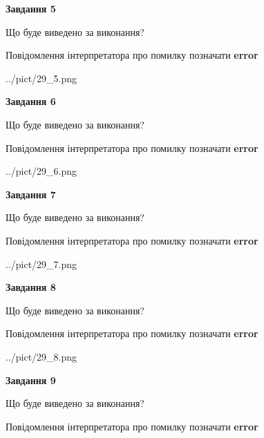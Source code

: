 \documentclass[11pt, ukrainian]{article}
\begin{document}
{\begin {large}
{\begin {center}\textbf{Завдання 5}\end {center}}\par
Що буде виведено за виконання? \par
Повідомлення інтерпретатора про помилку позначати \textbf{error}

\begin{center}
	{../pict/29_5.png}
\end{center}
\newpage

{\begin {center}\textbf{Завдання 6}\end {center}}\par
Що буде виведено за виконання? \par
Повідомлення інтерпретатора про помилку позначати \textbf{error}

\begin{center}
	{../pict/29_6.png}
\end{center}
\newpage

{\begin {center}\textbf{Завдання 7}\end {center}}\par
Що буде виведено за виконання? \par
Повідомлення інтерпретатора про помилку позначати \textbf{error}

\begin{center}
	{../pict/29_7.png}
\end{center}
\newpage

{\begin {center}\textbf{Завдання 8}\end {center}}\par
Що буде виведено за виконання? \par
Повідомлення інтерпретатора про помилку позначати \textbf{error}

\begin{center}
	{../pict/29_8.png}
\end{center}
\newpage

{\begin {center}\textbf{Завдання 9}\end {center}}\par
Що буде виведено за виконання? \par
Повідомлення інтерпретатора про помилку позначати \textbf{error}


\end{large}}
\end{document}
